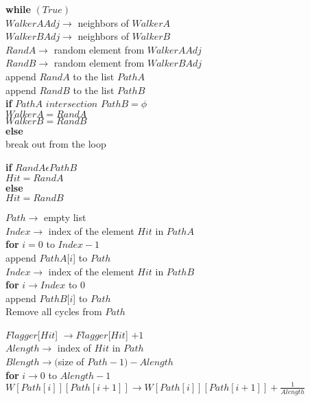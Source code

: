 \documentclass{article}
\begin{document}
			\textbf{while} $(True)$\\
				$WalkerAAdj \to $ neighbors of $WalkerA$\\
				$WalkerBAdj \to $ neighbors of $WalkerB$\\
				
				$RandA \to $ random element from $WalkerAAdj$\\
				$RandB \to $ random element from $WalkerBAdj$\\

				append $RandA$ to the list $PathA$\\
				append $RandB$ to the list $PathB$\\

				\textbf{if} $PathA$ $intersection$ $PathB = \phi$\\
					$WalkerA = RandA$\\
					$WalkerB = RandB$\\
				\textbf{else}\\
					break out from the loop

			\textbf{if} $RandA \epsilon PathB$\\
				$Hit = RandA$\\
			\textbf{else}\\ 
				$Hit = RandB$

			$Path \to $ empty list\\
			$Index \to $ index of the element $Hit$ in $PathA$\\
			\textbf{for} $i = 0$ to $Index-1$\\
				append $PathA$[$i$] to $Path$\\

			$Index \to$ index of the element $Hit$ in $PathB$\\
			\textbf{for} $i \to Index$ to $0$\\
				append $PathB$[$i$] to $Path$\\

			Remove all cycles from $Path$

			$Flagger$[$Hit$] $\to Flagger$[$Hit$] $+1$\\

			$Alength \to$ index of $Hit$ in $Path$\\
			$Blength \to ($size of $Path - 1) - Alength$\\

			\textbf{for} $i \to 0$ to $Alength-1$\\
				$W[Path[i]][Path[i+1]] \to W[Path[i]][Path[i+1]] + \frac{1}{Alength}$\\
			
\end{document}
